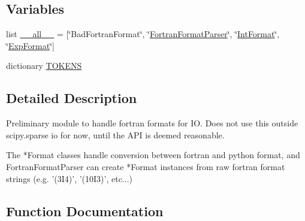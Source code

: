 \subsection*{Variables}
\begin{DoxyCompactItemize}
\item 
list \hyperlink{namespacescipy_1_1io_1_1harwell__boeing_1_1__fortran__format__parser_a7977e784c3842c91225411f530759d6b}{\+\_\+\+\_\+all\+\_\+\+\_\+} = \mbox{[}\char`\"{}Bad\+Fortran\+Format\char`\"{}, \char`\"{}\hyperlink{classscipy_1_1io_1_1harwell__boeing_1_1__fortran__format__parser_1_1FortranFormatParser}{Fortran\+Format\+Parser}\char`\"{}, \char`\"{}\hyperlink{classscipy_1_1io_1_1harwell__boeing_1_1__fortran__format__parser_1_1IntFormat}{Int\+Format}\char`\"{}, \char`\"{}\hyperlink{classscipy_1_1io_1_1harwell__boeing_1_1__fortran__format__parser_1_1ExpFormat}{Exp\+Format}\char`\"{}\mbox{]}
\item 
dictionary \hyperlink{namespacescipy_1_1io_1_1harwell__boeing_1_1__fortran__format__parser_abb69dcaa8c934b1b8fd9c03e1b2230be}{T\+O\+K\+E\+N\+S}
\end{DoxyCompactItemize}


\subsection{Detailed Description}
\begin{DoxyVerb}Preliminary module to handle fortran formats for IO. Does not use this outside
scipy.sparse io for now, until the API is deemed reasonable.

The *Format classes handle conversion between fortran and python format, and
FortranFormatParser can create *Format instances from raw fortran format
strings (e.g. '(3I4)', '(10I3)', etc...)
\end{DoxyVerb}
 

\subsection{Function Documentation}
\hypertarget{namespacescipy_1_1io_1_1harwell__boeing_1_1__fortran__format__parser_a8e6bf55a4a6293b9ed52662da6b4c363}{}
